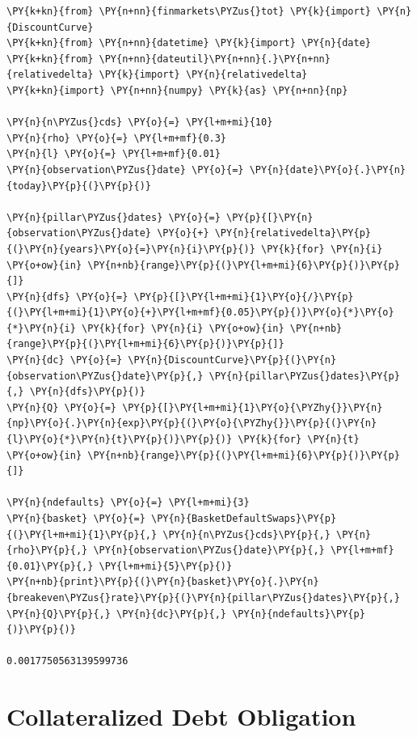 \begin{codebox}
\begin{Verbatim}[commandchars=\\\{\}]
\PY{k+kn}{from} \PY{n+nn}{finmarkets\PYZus{}tot} \PY{k}{import} \PY{n}{DiscountCurve}
\PY{k+kn}{from} \PY{n+nn}{datetime} \PY{k}{import} \PY{n}{date}
\PY{k+kn}{from} \PY{n+nn}{dateutil}\PY{n+nn}{.}\PY{n+nn}{relativedelta} \PY{k}{import} \PY{n}{relativedelta}
\PY{k+kn}{import} \PY{n+nn}{numpy} \PY{k}{as} \PY{n+nn}{np}
	
\PY{n}{n\PYZus{}cds} \PY{o}{=} \PY{l+m+mi}{10}
\PY{n}{rho} \PY{o}{=} \PY{l+m+mf}{0.3}
\PY{n}{l} \PY{o}{=} \PY{l+m+mf}{0.01}
\PY{n}{observation\PYZus{}date} \PY{o}{=} \PY{n}{date}\PY{o}{.}\PY{n}{today}\PY{p}{(}\PY{p}{)}
	
\PY{n}{pillar\PYZus{}dates} \PY{o}{=} \PY{p}{[}\PY{n}{observation\PYZus{}date} \PY{o}{+} \PY{n}{relativedelta}\PY{p}{(}\PY{n}{years}\PY{o}{=}\PY{n}{i}\PY{p}{)} \PY{k}{for} \PY{n}{i} \PY{o+ow}{in} \PY{n+nb}{range}\PY{p}{(}\PY{l+m+mi}{6}\PY{p}{)}\PY{p}{]}
\PY{n}{dfs} \PY{o}{=} \PY{p}{[}\PY{l+m+mi}{1}\PY{o}{/}\PY{p}{(}\PY{l+m+mi}{1}\PY{o}{+}\PY{l+m+mf}{0.05}\PY{p}{)}\PY{o}{*}\PY{o}{*}\PY{n}{i} \PY{k}{for} \PY{n}{i} \PY{o+ow}{in} \PY{n+nb}{range}\PY{p}{(}\PY{l+m+mi}{6}\PY{p}{)}\PY{p}{]}
\PY{n}{dc} \PY{o}{=} \PY{n}{DiscountCurve}\PY{p}{(}\PY{n}{observation\PYZus{}date}\PY{p}{,} \PY{n}{pillar\PYZus{}dates}\PY{p}{,} \PY{n}{dfs}\PY{p}{)}
\PY{n}{Q} \PY{o}{=} \PY{p}{[}\PY{l+m+mi}{1}\PY{o}{\PYZhy{}}\PY{n}{np}\PY{o}{.}\PY{n}{exp}\PY{p}{(}\PY{o}{\PYZhy{}}\PY{p}{(}\PY{n}{l}\PY{o}{*}\PY{n}{t}\PY{p}{)}\PY{p}{)} \PY{k}{for} \PY{n}{t} \PY{o+ow}{in} \PY{n+nb}{range}\PY{p}{(}\PY{l+m+mi}{6}\PY{p}{)}\PY{p}{]}
	
\PY{n}{ndefaults} \PY{o}{=} \PY{l+m+mi}{3}
\PY{n}{basket} \PY{o}{=} \PY{n}{BasketDefaultSwaps}\PY{p}{(}\PY{l+m+mi}{1}\PY{p}{,} \PY{n}{n\PYZus{}cds}\PY{p}{,} \PY{n}{rho}\PY{p}{,} \PY{n}{observation\PYZus{}date}\PY{p}{,} \PY{l+m+mf}{0.01}\PY{p}{,} \PY{l+m+mi}{5}\PY{p}{)}
\PY{n+nb}{print}\PY{p}{(}\PY{n}{basket}\PY{o}{.}\PY{n}{breakeven\PYZus{}rate}\PY{p}{(}\PY{n}{pillar\PYZus{}dates}\PY{p}{,} \PY{n}{Q}\PY{p}{,} \PY{n}{dc}\PY{p}{,} \PY{n}{ndefaults}\PY{p}{)}\PY{p}{)}

0.0017750563139599736
\end{Verbatim}
\end{codebox}


\section{Collateralized Debt Obligation}\label{collateralized-debt-obligation}

